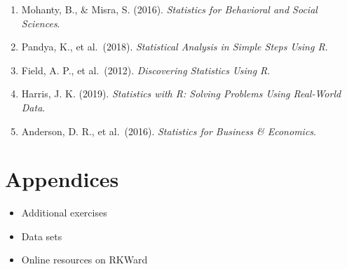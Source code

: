 \documentclass[
  letterpaper,
  DIV=11,
  numbers=noendperiod]{scrreprt}
\newlength{\cslhangindent}
\newenvironment{CSLReferences}[2] %
 {\begin{list}{}{%
  \setlength{\itemindent}{0pt}
  \setlength{\leftmargin}{0pt}
  \setlength{\parsep}{0pt}
  \ifodd #1
   \setlength{\leftmargin}{\cslhangindent}
   \setlength{\itemindent}{-1\cslhangindent}
  \fi
  \setlength{\itemsep}{#2\baselineskip}}}
 {\end{list}}
\providecommand{\tightlist}{%
  \setlength{\itemsep}{0pt}\setlength{\parskip}{0pt}}
\begin{document}
\label{refs}
\begin{CSLReferences}{0}{1}
\begin{enumerate}
\def\labelenumi{\arabic{enumi}.}
\tightlist
\item
  Mohanty, B., \& Misra, S. (2016). \emph{Statistics for Behavioral and
  Social Sciences}.
\item
  Pandya, K., et al.~(2018). \emph{Statistical Analysis in Simple Steps
  Using R}.
\item
  Field, A. P., et al.~(2012). \emph{Discovering Statistics Using R}.
\item
  Harris, J. K. (2019). \emph{Statistics with R: Solving Problems Using
  Real-World Data}.
\item
  Anderson, D. R., et al.~(2016). \emph{Statistics for Business \&
  Economics}.
\end{enumerate}

\end{CSLReferences}


\chapter{Appendices}\label{appendices}

\begin{itemize}
\tightlist
\item
  Additional exercises
\item
  Data sets
\item
  Online resources on RKWard
\end{itemize}
\end{document}
